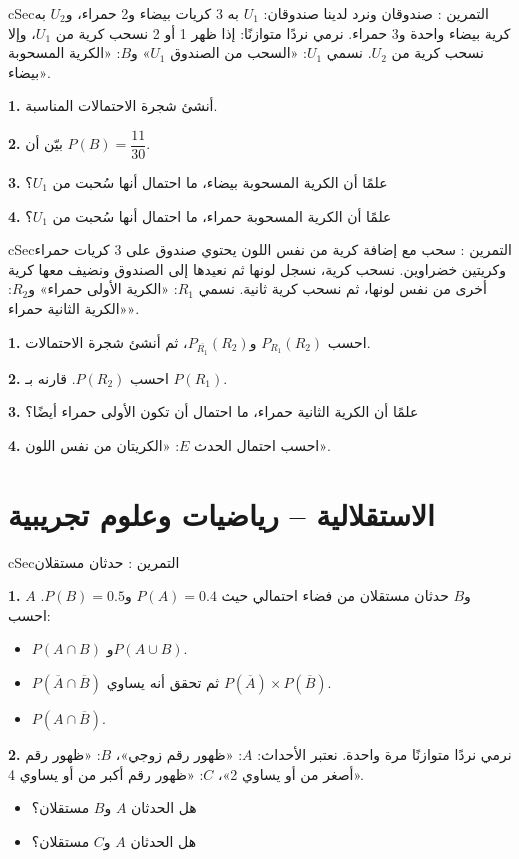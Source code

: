\documentclass[12pt,a4paper]{article}
\newenvironment{BOX}[2]{\begin{otherlanguage}{english}\begin{arbox}{#1}{#2}}{\end{arbox}\end{otherlanguage}}
\newcounter{exo}
\newenvironment{tamrin}[1]{\stepcounter{exo}\begin{BOX}{cSec}{التمرين \theexo: #1}}{\end{BOX}}
\newenvironment{sq}{\begin{itemize}[leftmargin=2.4em,itemsep=3pt]}{\end{itemize}}
\newcommand{\qa}{\item[(أ)]}\newcommand{\qb}{\item[(ب)]}\newcommand{\qc}{\item[(جـ)]}\newcommand{\qd}{\item[(د)]}\newcommand{\qe}{\item[(هـ)]}
\newcommand{\QQ}[1]{\par\smallskip\textbf{#1.} }
\begin{document}
\begin{tamrin}{صندوقان ونرد}
لدينا صندوقان: $U_1$ به 3 كريات بيضاء و2 حمراء، و$U_2$ به كرية بيضاء واحدة و3 حمراء. نرمي نردًا متوازنًا: إذا ظهر 1 أو 2 نسحب كرية من $U_1$، وإلا نسحب كرية من $U_2$. نسمي $U_1$: «السحب من الصندوق $U_1$» و$B$: «الكرية المسحوبة بيضاء».
\QQ{1} أنشئ شجرة الاحتمالات المناسبة.
\QQ{2} بيّن أن $P(B)=\dfrac{11}{30}$.
\QQ{3} علمًا أن الكرية المسحوبة بيضاء، ما احتمال أنها سُحبت من $U_1$؟
\QQ{4} علمًا أن الكرية المسحوبة حمراء، ما احتمال أنها سُحبت من $U_1$؟
\end{tamrin}

\begin{tamrin}{سحب مع إضافة كرية من نفس اللون}
يحتوي صندوق على 3 كريات حمراء وكريتين خضراوين. نسحب كرية، نسجل لونها ثم نعيدها إلى الصندوق ونضيف معها كرية أخرى من نفس لونها، ثم نسحب كرية ثانية. نسمي $R_1$: «الكرية الأولى حمراء» و$R_2$: «الكرية الثانية حمراء».
\QQ{1} احسب $P_{R_1}(R_2)$ و$P_{\overline{R_1}}(R_2)$، ثم أنشئ شجرة الاحتمالات.
\QQ{2} احسب $P(R_2)$. قارنه بـ $P(R_1)$.
\QQ{3} علمًا أن الكرية الثانية حمراء، ما احتمال أن تكون الأولى حمراء أيضًا؟
\QQ{4} احسب احتمال الحدث $E$: «الكريتان من نفس اللون».
\end{tamrin}

\section{الاستقلالية -- رياضيات وعلوم تجريبية}

\begin{tamrin}{حدثان مستقلان}
\QQ{1} $A$ و$B$ حدثان مستقلان من فضاء احتمالي حيث $P(A)=0.4$ و$P(B)=0.5$. احسب:
\begin{sq}
\qa $P(A\cap B)$ و$P(A\cup B)$.
\qb $P(\overline{A}\cap\overline{B})$ ثم تحقق أنه يساوي $P(\overline{A})\times P(\overline{B})$.
\qc $P(A\cap\overline{B})$.
\end{sq}
\QQ{2} نرمي نردًا متوازنًا مرة واحدة. نعتبر الأحداث: $A$: «ظهور رقم زوجي»، $B$: «ظهور رقم أصغر من أو يساوي 2»، $C$: «ظهور رقم أكبر من أو يساوي 4».
\begin{sq}
\qa هل الحدثان $A$ و$B$ مستقلان؟
\qb هل الحدثان $A$ و$C$ مستقلان؟
\end{sq}
\end{tamrin}
\end{document}
